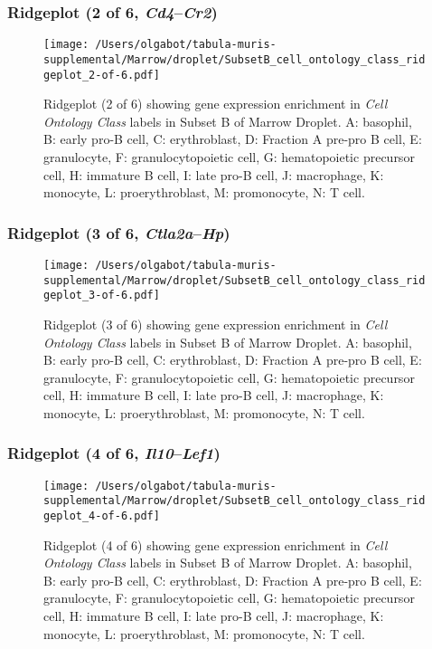 \clearpage

\subsubsection{Ridgeplot (2 of 6, \emph{Cd4}--\emph{Cr2})}
\begin{figure}[h]
\centering
\texttt{[image: /Users/olgabot/tabula-muris-supplemental/Marrow/droplet/SubsetB\_cell\_ontology\_class\_ridgeplot\_2-of-6.pdf]}

\caption{ Ridgeplot (2 of 6)  showing gene expression enrichment in \emph{Cell Ontology Class} labels in Subset B of Marrow Droplet. A: basophil, B: early pro-B cell, C: erythroblast, D: Fraction A pre-pro B cell, E: granulocyte, F: granulocytopoietic cell, G: hematopoietic precursor cell, H: immature B cell, I: late pro-B cell, J: macrophage, K: monocyte, L: proerythroblast, M: promonocyte, N: T cell.}
\end{figure}


\clearpage

\subsubsection{Ridgeplot (3 of 6, \emph{Ctla2a}--\emph{Hp})}
\begin{figure}[h]
\centering
\texttt{[image: /Users/olgabot/tabula-muris-supplemental/Marrow/droplet/SubsetB\_cell\_ontology\_class\_ridgeplot\_3-of-6.pdf]}

\caption{ Ridgeplot (3 of 6)  showing gene expression enrichment in \emph{Cell Ontology Class} labels in Subset B of Marrow Droplet. A: basophil, B: early pro-B cell, C: erythroblast, D: Fraction A pre-pro B cell, E: granulocyte, F: granulocytopoietic cell, G: hematopoietic precursor cell, H: immature B cell, I: late pro-B cell, J: macrophage, K: monocyte, L: proerythroblast, M: promonocyte, N: T cell.}
\end{figure}


\clearpage

\subsubsection{Ridgeplot (4 of 6, \emph{Il10}--\emph{Lef1})}
\begin{figure}[h]
\centering
\texttt{[image: /Users/olgabot/tabula-muris-supplemental/Marrow/droplet/SubsetB\_cell\_ontology\_class\_ridgeplot\_4-of-6.pdf]}

\caption{ Ridgeplot (4 of 6)  showing gene expression enrichment in \emph{Cell Ontology Class} labels in Subset B of Marrow Droplet. A: basophil, B: early pro-B cell, C: erythroblast, D: Fraction A pre-pro B cell, E: granulocyte, F: granulocytopoietic cell, G: hematopoietic precursor cell, H: immature B cell, I: late pro-B cell, J: macrophage, K: monocyte, L: proerythroblast, M: promonocyte, N: T cell.}
\end{figure}


